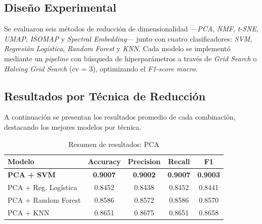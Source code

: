 \documentclass[conference]{IEEEtran}
\begin{document}
\subsection{Diseño Experimental}

Se evaluaron seis métodos de reducción de dimensionalidad —\textit{PCA}, \textit{NMF}, \textit{t-SNE}, \textit{UMAP}, \textit{ISOMAP} y \textit{Spectral Embedding}— junto con cuatro clasificadores: \textit{SVM}, \textit{Regresión Logística}, \textit{Random Forest} y \textit{KNN}.  
Cada modelo se implementó mediante un \textit{pipeline} con búsqueda de hiperparámetros a través de \textit{Grid Search} o \textit{Halving Grid Search} (cv = 3), optimizando el \textit{F1-score macro}.

\begin{table}[H]
\centering
\caption{Resumen de combinaciones experimentales evaluadas.}
\setlength{\tabcolsep}{4pt}
\label{tab:combos}
\end{table}

\subsection{Resultados por Técnica de Reducción}

A continuación se presentan los resultados promedio de cada combinación, destacando los mejores modelos por técnica.

\begin{table}[H]
\centering
\caption{Resumen de resultados: PCA}
\begin{tabular}{lcccc}
\toprule
\textbf{Modelo} & \textbf{Accuracy} & \textbf{Precision} & \textbf{Recall} & \textbf{F1} \\
\midrule
\textbf{PCA + SVM} & \textbf{0.9007} & \textbf{0.9002} & \textbf{0.9007} & \textbf{0.9003} \\
PCA + Reg. Logística & 0.8452 & 0.8438 & 0.8452 & 0.8441 \\
PCA + Random Forest & 0.8586 & 0.8572 & 0.8586 & 0.8570 \\
PCA + KNN & 0.8651 & 0.8675 & 0.8651 & 0.8658 \\
\bottomrule
\end{tabular}
\label{tab:pca}
\end{table}
\vspace{-6pt}
\end{document}
